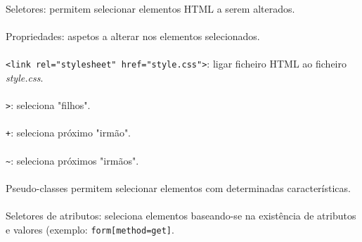 \documentclass[../resumosLTW.tex]{subfiles}
\begin{document}
 

Seletores: permitem selecionar elementos HTML a serem alterados.

\paragraph{}

Propriedades: aspetos a alterar nos elementos selecionados.

\paragraph{}

\lstinline{<link rel="stylesheet" href="style.css">}: ligar ficheiro HTML ao ficheiro \emph{style.css}.

\paragraph{}

\lstinline{>}: seleciona "filhos".

\paragraph{}

\lstinline{+}: seleciona próximo "irmão".

\paragraph{}

\lstinline{~}: seleciona próximos "irmãos". 

\paragraph{}

Pseudo-classes permitem selecionar elementos com determinadas características.

\paragraph{}

Seletores de atributos: seleciona elementos baseando-se na existência de atributos e valores (exemplo: \lstinline{form[method=get]}.

\paragraph{}
\end{document}
